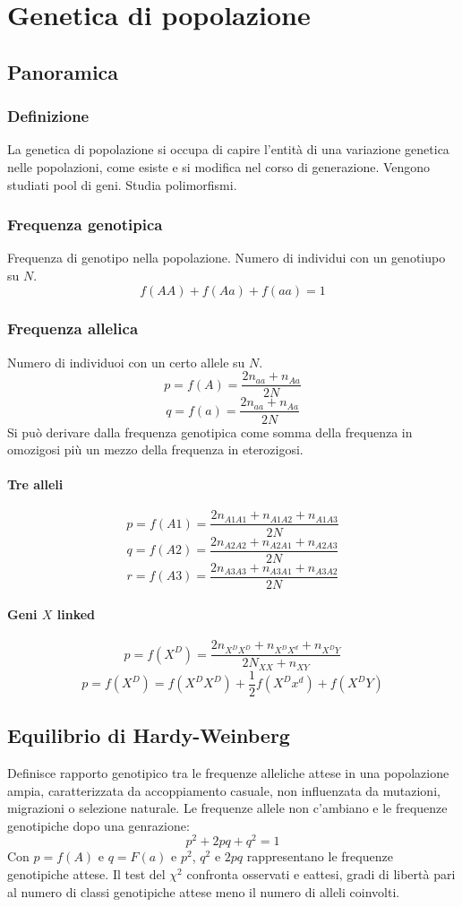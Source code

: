 \chapter{Genetica di popolazione}

\section{Panoramica}

	\subsection{Definizione}
	La genetica di popolazione si occupa di capire l'entit\`a di una variazione genetica nelle popolazioni, come esiste e si modifica nel corso di generazione.
	Vengono studiati pool di geni.
	Studia polimorfismi.

	\subsection{Frequenza genotipica}
	Frequenza di genotipo nella popolazione.
	Numero di individui con un genotiupo su $N$.
	\[f(AA)+f(Aa)+f(aa) = 1\]

	\subsection{Frequenza allelica}
	Numero di individuoi con un certo allele su $N$.
	\[p=f(A)=\dfrac{2n_{aa} + n_{Aa}}{2N}\]
	\[q=f(a)=\dfrac{2n_{aa} + n_{Aa}}{2N}\]
	Si pu\`o derivare dalla frequenza genotipica come somma della frequenza in omozigosi pi\`u un mezzo della frequenza in eterozigosi.

		\subsubsection{Tre alleli}
		\[p = f(A1) = \dfrac{2n_{A1A1} + n_{A1A2} + n_{A1A3}}{2N}\]
		\[q = f(A2) = \dfrac{2n_{A2A2} + n_{A2A1} + n_{A2A3}}{2N}\]
		\[r = f(A3) = \dfrac{2n_{A3A3} + n_{A3A1} + n_{A3A2}}{2N}\]

		\subsubsection{Geni $X$ linked}
		\[p = f(X^D) = \dfrac{2n_{X^DX^D} + n_{X^DX^d} + n_{X^DY}}{2N_{XX} + n_{XY}}\]
		\[p = f(X^D) = f(X^DX^D) + \frac{1}{2}f(X^Dx^d) + f(X^DY)\]

\section{Equilibrio di Hardy-Weinberg}
Definisce rapporto genotipico tra le frequenze alleliche attese in una popolazione ampia, caratterizzata da accoppiamento casuale, non influenzata da mutazioni, migrazioni o selezione naturale.
Le frequenze allele non c'ambiano e le frequenze genotipiche dopo una genrazione:
\[p^2+2pq+q^2=1\]
Con $p = f(A)$ e $q = F(a)$ e $p^2$, $q^2$ e $2pq$ rappresentano le frequenze genotipiche attese.
Il test del $\chi^2$ confronta osservati e eattesi, gradi di libert\`a pari al numero di classi genotipiche attese meno il numero di alleli coinvolti.

